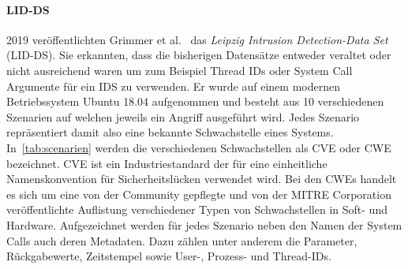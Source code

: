             \paragraph{\ac{LID-DS}}\label{sec:LIDDS}
                2019 veröffentlichten Grimmer et al.~\cite{LIDDS} das \textit{Leipzig Intrusion Detection-Data Set} (\ac{LID-DS}).
                Sie erkannten, dass die bisherigen Datensätze entweder veraltet oder nicht ausreichend waren um zum Beispiel Thread IDs oder System Call Argumente für ein \ac{IDS} zu verwenden.
                Er wurde auf einem modernen Betriebssystem Ubuntu 18.04 aufgenommen und besteht aus 10 verschiedenen Szenarien auf welchen jeweils ein Angriff ausgeführt wird.
                Jedes Szenario repräsentiert damit also eine bekannte Schwachstelle eines Systems.
                In~\autoref{tab:scenarien} werden die verschiedenen Schwachstellen als \ac{CVE}
                 oder \ac{CWE}  bezeichnet.
                \ac{CVE} ist ein Industriestandard der für eine einheitliche Namenskonvention für Sicherheitslücken verwendet wird.
                Bei den CWEs handelt es sich um eine von der Community gepflegte und von der MITRE Corporation veröffentlichte Auflistung verschiedener Typen von Schwachstellen in Soft- und Hardware.
                Aufgezeichnet werden für jedes Szenario neben den Namen der System Calls auch deren Metadaten.
                Dazu zählen unter anderem die Parameter, Rückgabewerte, Zeitstempel sowie User-, Prozess- und Thread-IDs.
